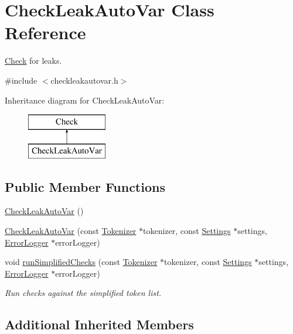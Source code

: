 \hypertarget{class_check_leak_auto_var}{\section{Check\-Leak\-Auto\-Var Class Reference}
\label{class_check_leak_auto_var}
}


\hyperlink{class_check}{Check} for leaks.  




{\ttfamily \#include $<$checkleakautovar.\-h$>$}

Inheritance diagram for Check\-Leak\-Auto\-Var\-:\begin{figure}[H]
\begin{center}
\leavevmode
\includegraphics[height=2.000000cm]{class_check_leak_auto_var}
\end{center}
\end{figure}
\subsection*{Public Member Functions}
\begin{DoxyCompactItemize}
\item 
\hyperlink{class_check_leak_auto_var_acd4e50adc6480379df8ba95f56ac7c80}{Check\-Leak\-Auto\-Var} ()
\item 
\hyperlink{class_check_leak_auto_var_ab4c077a16e03c7ae0ecd349d8e735e83}{Check\-Leak\-Auto\-Var} (const \hyperlink{class_tokenizer}{Tokenizer} $\ast$tokenizer, const \hyperlink{class_settings}{Settings} $\ast$settings, \hyperlink{class_error_logger}{Error\-Logger} $\ast$error\-Logger)
\item 
void \hyperlink{class_check_leak_auto_var_a7dc47439661a63d0033b616162d9dd88}{run\-Simplified\-Checks} (const \hyperlink{class_tokenizer}{Tokenizer} $\ast$tokenizer, const \hyperlink{class_settings}{Settings} $\ast$settings, \hyperlink{class_error_logger}{Error\-Logger} $\ast$error\-Logger)
\begin{DoxyCompactList}\small\item\em Run checks against the simplified token list. \end{DoxyCompactList}\end{DoxyCompactItemize}
\subsection*{Additional Inherited Members}



